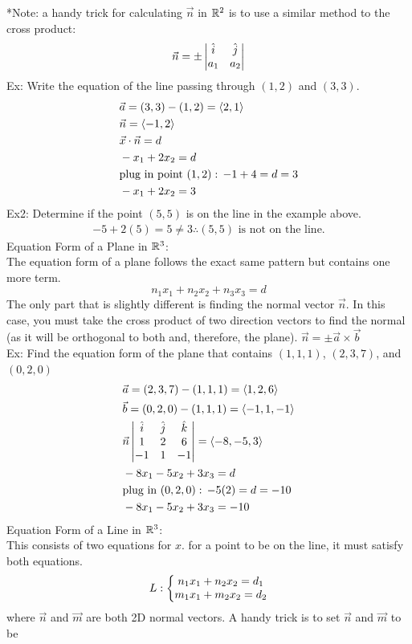 \documentclass[11pt, fleqn]{article}
\begin{document}
*Note: a handy trick for calculating $\vec{n}$ in $\mathbb{R}^2$ is to use a similar method to the cross product:
$$\vec{n}=\pm\left|\begin{matrix} \hat{i}&\hat{j}\\a_1&a_2 \end{matrix}\right|$$
Ex: Write the equation of the line passing through $(1,2)$ and $(3,3)$.
\begin{align*}
    &\vec{a}=(3,3)-(1,2)=\left\langle 2,1 \right\rangle\\
    &\vec{n}=\left\langle -1,2 \right\rangle\\
    &\vec{x}\cdot\vec{n}=d\\
    &-x_1+2x_2=d\\
    &\text{plug in point }(1,2):\,-1+4=d=3\\
    &-x_1+2x_2=3
\end{align*}
Ex2: Determine if the point $(5,5)$ is on the line in the example above.
\begin{align*}
    -5+2(5)=5\neq3\therefore(5,5)\text{ is not on the line.}
\end{align*}
Equation Form of a Plane in $\mathbb{R}^3$:\\
The equation form of a plane follows the exact same pattern but contains one more term.
$$n_1x_1+n_2x_2+n_3x_3=d$$
The only part that is slightly different is finding the normal vector $\vec{n}$. In this case, you must take the cross product of two direction vectors to find the normal (as it will be orthogonal to both and, therefore, the plane). $\vec{n}=\pm\vec{a}\times\vec{b}$\\
Ex: Find the equation form of the plane that contains $(1,1,1)$, $(2,3,7)$, and $(0,2,0)$
\begin{align*}
    &\vec{a}=(2,3,7)-(1,1,1)=\left\langle 1,2,6 \right\rangle\\
    &\vec{b}=(0,2,0)-(1,1,1)=\left\langle -1,1,-1 \right\rangle\\
    &\vec{n}\left|\begin{matrix} \hat{i}&\hat{j}&\hat{k}\\1&2&6\\-1&1&-1 \end{matrix}\right|=\left\langle -8,-5,3 \right\rangle\\
    &-8x_1-5x_2+3x_3=d\\
    &\text{plug in }(0,2,0):\,-5(2)=d=-10\\
    &-8x_1-5x_2+3x_3=-10
\end{align*}
Equation Form of a Line in $\mathbb{R}^3$:\\
This consists of two equations for $x$. for a point to be on the line, it must satisfy both equations.
$$L:\left\{\begin{matrix} n_1x_1+n_2x_2=d_1\\m_1x_1+m_2x_2=d_2 \end{matrix}\right.$$
where $\vec{n}$ and $\vec{m}$ are both 2D normal vectors. A handy trick is to set $\vec{n}$ and $\vec{m}$ to be
\end{document}
